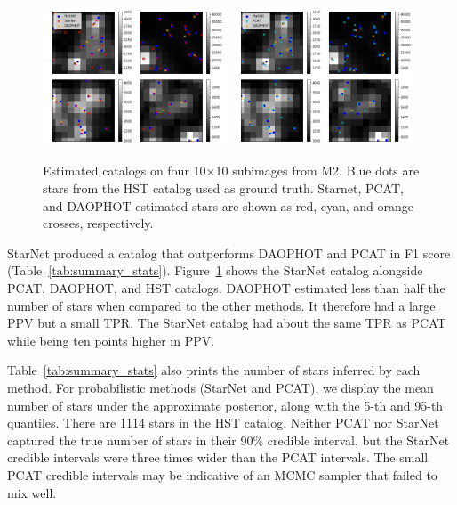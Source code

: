 \begin{figure}[tb]
    \centering
    \includegraphics[width=0.49\textwidth]{figures/m2_results/example_subimages_starnet.png}
    \includegraphics[width=0.49\textwidth]{figures/m2_results/example_subimages_pcat.png}
    \caption{Estimated catalogs on four 10$\times$10 subimages from
    M2. Blue dots are stars from the HST catalog used as ground truth.
    Starnet, PCAT, and DAOPHOT estimated stars are shown as
    red, cyan, and orange crosses, respectively. }
    \label{fig:example_subimages}
\end{figure}

StarNet produced a catalog that outperforms DAOPHOT and PCAT in F1 score (Table~\ref{tab:summary_stats}).
Figure~\ref{fig:example_subimages} shows the StarNet catalog alongside PCAT, DAOPHOT, and HST catalogs.
DAOPHOT estimated less than half the number of stars when compared to the other methods.
It therefore had a large PPV but a small TPR.
The StarNet catalog had about the same TPR as PCAT while being ten points higher in PPV.

Table~\ref{tab:summary_stats} also prints the number of stars inferred by each method.
For probabilistic methods (StarNet and PCAT),
 we display the mean number of stars under the approximate posterior, along with the 5-th and 95-th quantiles.
There are 1114 stars in the HST catalog.
Neither PCAT nor StarNet captured the true number of stars in their 90\% credible interval,
but the StarNet credible intervals were three times wider than the PCAT intervals.
The small PCAT credible intervals may be indicative of an MCMC sampler that failed to mix well.

